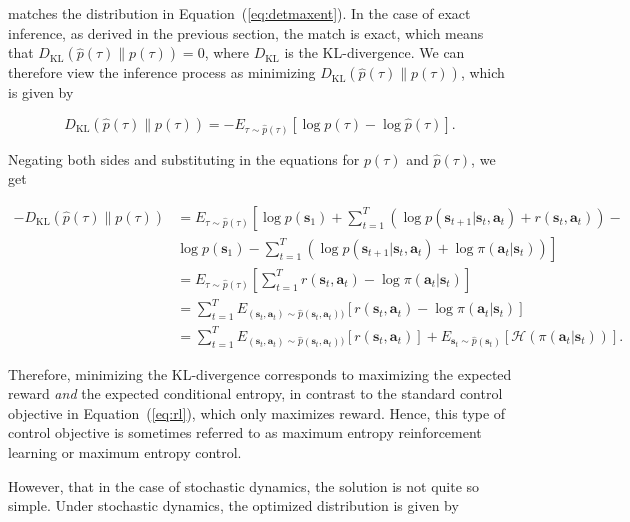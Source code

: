 matches the distribution in Equation~(\ref{eq:detmaxent}). In the case of exact inference, as derived in the previous section, the match is exact, which means that $D_\text{KL}(\hat{p}(\tau) \| p(\tau)) = 0$, where $D_\text{KL}$ is the KL-divergence. We can therefore view the inference process as minimizing $D_\text{KL}(\hat{p}(\tau) \| p(\tau))$, which is given by

\begin{equation*}
D_\text{KL}(\hat{p}(\tau) \| p(\tau)) = -E_{\tau \sim \hat{p}(\tau)}[\log p(\tau) - \log \hat{p}(\tau)].
\end{equation*}

Negating both sides and substituting in the equations for $p(\tau)$ and $\hat{p}(\tau)$, we get

\begin{align*}
-D_\text{KL}(\hat{p}(\tau) \| p(\tau)) &= E_{\tau \sim \hat{p}(\tau)}\left[ \log p(\mathbf{s}_1) +  \sum_{t=1}^T \left( \log p(\mathbf{s}_{t+1} |\mathbf{s}_t,\mathbf{a}_t) + r(\mathbf{s}_t,\mathbf{a}_t) \right) - \right. \\
&  \left. \log p(\mathbf{s}_1) - \sum_{t=1}^T \left( \log p(\mathbf{s}_{t+1} | \mathbf{s}_t,\mathbf{a}_t) + \log\pi(\mathbf{a}_t|\mathbf{s}_t) \right) \right] \\
&= E_{\tau \sim \hat{p}(\tau)}\left[ \sum_{t=1}^T r(\mathbf{s}_t,\mathbf{a}_t) - \log\pi(\mathbf{a}_t|\mathbf{s}_t) \right] \\
&= \sum_{t=1}^T E_{(\mathbf{s}_t,\mathbf{a}_t) \sim \hat{p}(\mathbf{s}_t,\mathbf{a}_t))}[r(\mathbf{s}_t,\mathbf{a}_t) - \log\pi(\mathbf{a}_t|\mathbf{s}_t)] \\
&= \sum_{t=1}^T E_{(\mathbf{s}_t,\mathbf{a}_t) \sim \hat{p}(\mathbf{s}_t,\mathbf{a}_t))}[r(\mathbf{s}_t,\mathbf{a}_t)] + E_{\mathbf{s}_t \sim \hat{p}(\mathbf{s}_t)}[ \mathcal{H}(\pi(\mathbf{a}_t|\mathbf{s}_t))].\label{eq:maxentpolicy}
\end{align*}

Therefore, minimizing the KL-divergence corresponds to maximizing the expected reward \emph{and} the expected conditional entropy, in contrast to the standard control objective in Equation~(\ref{eq:rl}), which only maximizes reward. Hence, this type of control objective is sometimes referred to as maximum entropy reinforcement learning or maximum entropy control.

However, that in the case of stochastic dynamics, the solution is not quite so simple. Under stochastic dynamics, the optimized distribution is given by

